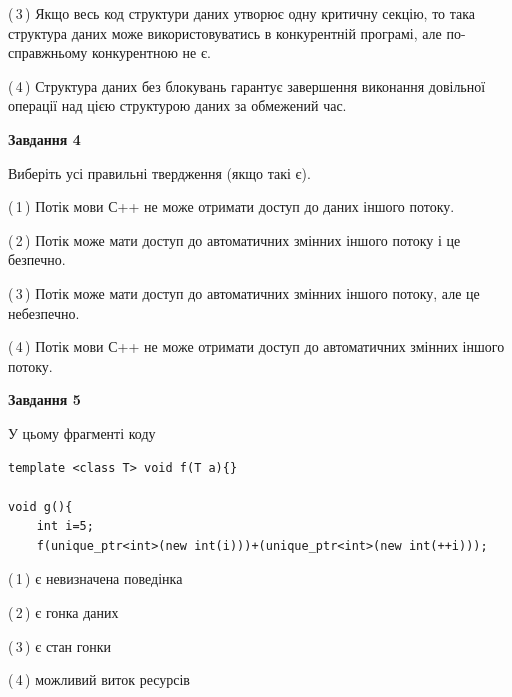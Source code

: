 \documentclass[12pt, ukrainian]{article}
\begin{document}
\begin {large}
{(\,3\,) Якщо весь код структури даних утворює одну критичну секцію, то така структура даних може використовуватись в конкурентній програмі, але по-справжньо\-му конкурентною не є.%

(\,4\,) Структура даних без блокувань гарантує завершення виконання довільної операції над цією структурою даних за обмежений час.%



\begin{center}
\textbf{Завдання 4}
\end{center}
Виберіть усі правильні твердження (якщо такі є).\par
\vspace{2mm}

(\,1\,) Потік мови С++ не може отримати доступ до даних іншого потоку.%

(\,2\,) Потік може мати доступ до автоматичних змінних іншого потоку і це безпечно.%

(\,3\,) Потік може мати доступ до автоматичних змінних іншого потоку, але це небезпечно.%

(\,4\,) Потік мови С++ не може отримати доступ до автоматичних змінних іншого потоку.%



\begin{center}
\textbf{Завдання 5}
\end{center}
У цьому фрагменті коду
\begin{verbatim}
template <class T> void f(T a){}

void g(){
    int i=5;
    f(unique_ptr<int>(new int(i)))+(unique_ptr<int>(new int(++i)));
\end{verbatim}
(\,1\,) є невизначена поведінка%

(\,2\,) є гонка даних%

(\,3\,) є стан гонки%

(\,4\,) можливий виток ресурсів%


}
\end {large}
\end{document}

